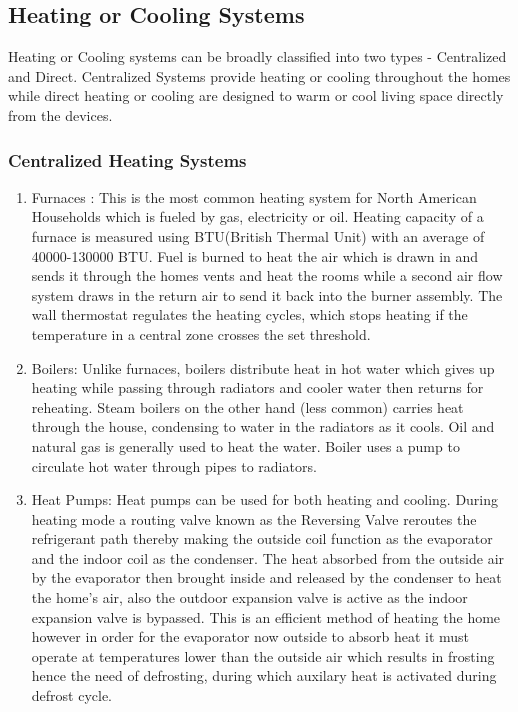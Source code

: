 \documentclass{sig-alternate}
\begin{document}
\subsection{Heating or Cooling Systems} 


 \indent Heating or Cooling systems can be broadly classified into two types - Centralized and Direct. Centralized Systems provide heating or cooling throughout the homes while direct heating or cooling are designed to warm or cool living space directly from the devices.
    
\subsubsection{Centralized Heating Systems} 
    
    
 
\begin{enumerate}
\item Furnaces : This is the most common heating system for North American Households which is fueled by gas, electricity or oil. Heating capacity of a furnace is measured using BTU(British Thermal Unit) with an average of 40000-130000 BTU. Fuel is burned to heat the air which is drawn in and sends it through the homes vents and heat the rooms while a second air flow system draws in the return air to send it back into the burner assembly. The wall thermostat regulates the heating cycles, which stops heating if the temperature in a central zone crosses the set threshold. 

\item Boilers: Unlike furnaces, boilers distribute heat in hot water which gives up heating while passing through radiators and cooler water then returns for reheating. Steam boilers on the other hand (less common) carries heat through the house, condensing to water in the radiators as it cools. Oil and natural gas is generally used to heat the water. Boiler uses a pump to circulate hot water through pipes to radiators. 

\item Heat Pumps: Heat pumps can be used for both heating and cooling. During heating mode a routing valve known as the Reversing Valve reroutes the refrigerant path thereby making the outside coil function as the evaporator and the indoor coil as the condenser. The heat absorbed from the outside air by the evaporator then brought inside and released by the condenser to heat the home's air, also the outdoor expansion valve is active as the indoor expansion valve is bypassed. This is an efficient method of heating the home however in order for the evaporator now outside to absorb heat it must operate at temperatures lower than the outside air which results in frosting hence the need of defrosting, during which auxilary heat is activated during defrost cycle. 
\end{enumerate} 
 
\end{document}
